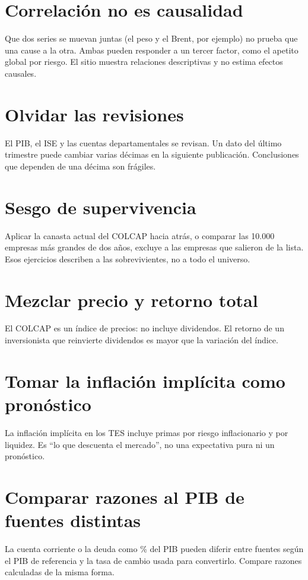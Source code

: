 \section{Correlación no es causalidad}
Que dos series se muevan juntas (el peso y el Brent, por ejemplo) no prueba que una cause a la otra. Ambas pueden
responder a un tercer factor, como el apetito global por riesgo. El sitio muestra relaciones descriptivas y no estima
efectos causales.

\section{Olvidar las revisiones}
El PIB, el ISE y las cuentas departamentales se revisan. Un dato del último trimestre puede cambiar varias décimas en
la siguiente publicación. Conclusiones que dependen de una décima son frágiles.

\section{Sesgo de supervivencia}
Aplicar la canasta actual del COLCAP hacia atrás, o comparar las 10.000 empresas más grandes de dos años, excluye a las
empresas que salieron de la lista. Esos ejercicios describen a las sobrevivientes, no a todo el universo.

\section{Mezclar precio y retorno total}
El COLCAP es un índice de precios: no incluye dividendos. El retorno de un inversionista que reinvierte dividendos es
mayor que la variación del índice.

\section{Tomar la inflación implícita como pronóstico}
La inflación implícita en los TES incluye primas por riesgo inflacionario y por liquidez. Es ``lo que descuenta el
mercado'', no una expectativa pura ni un pronóstico.

\section{Comparar razones al PIB de fuentes distintas}
La cuenta corriente o la deuda como \% del PIB pueden diferir entre fuentes según el PIB de referencia y la tasa de
cambio usada para convertirlo. Compare razones calculadas de la misma forma.

